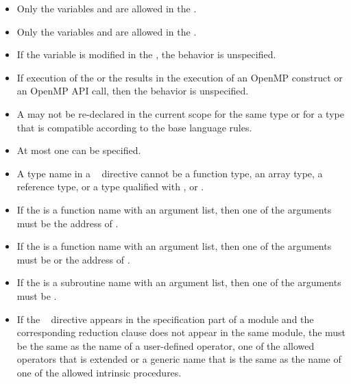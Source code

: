 {{{{\restrictions
\begin{itemize}
\item Only the variables  and  are allowed in the .

\item Only the variables  and  are allowed in the .

\item If the variable  is modified in the , the behavior is 
unspecified. 

\item If execution of the  or the  results in the execution of an 
OpenMP construct or an OpenMP API call, then the behavior is unspecified.

\item A  may not be re-declared in the current scope for the same type 
or for a type that is compatible according to the base language rules.

\item At most one  can be specified. 

\ccppspecificstart
\item A type name in a ~ directive cannot be a function type, an 
array type, a reference type, or a type qualified with ,  or 
. 
\ccppspecificend
\bigskip

\cspecificstart
\item If the  is a function name with an argument list, then one of the 
arguments must be the address of . 
\cspecificend
\bigskip

\cppspecificstart
\item If the  is a function name with an argument list, then one of the 
arguments must be  or the address of . 
\cppspecificend
\bigskip

\fortranspecificstart
\item If the  is a subroutine name with an argument list, then one of the 
arguments must be .

\item If the ~ directive appears in the specification part of a module and the corresponding reduction clause does not appear in the same module, the  must be the same as the name of a user-defined operator, one of the allowed operators that is extended or a generic name that is the same as the name of one of the allowed intrinsic procedures. 


\end{itemize}}}}}
